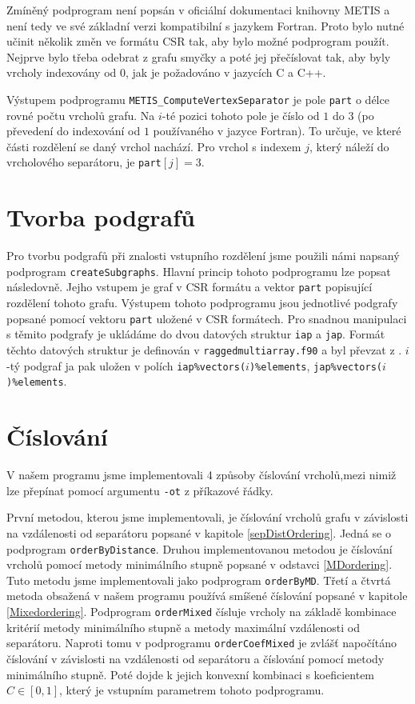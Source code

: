 \documentclass{ctuthesis}
\theoremstyle{plain}
\theoremstyle{definition}
\begin{document}
Zmíněný podprogram není popsán v oficiální dokumentaci knihovny METIS a není tedy ve své základní verzi kompatibilní s jazykem Fortran. Proto bylo nutné učinit několik změn ve formátu CSR tak, aby bylo možné podprogram použít. Nejprve bylo třeba odebrat z grafu smyčky a poté jej přečíslovat tak, aby byly vrcholy indexovány od 0, jak je požadováno v jazycích C a C++.

Výstupem podprogramu \texttt{METIS\_ComputeVertexSeparator} je pole \texttt{part} o délce rovné počtu vrcholů grafu. Na $i$-té pozici tohoto pole je číslo od $1$ do $3$ (po převedení do indexování od $1$ používaného v jazyce Fortran). To určuje, ve které části rozdělení se daný vrchol nachází. Pro vrchol s indexem $j$, který náleží do vrcholového separátoru, je \texttt{part}$[j] = 3$.

\section{Tvorba podgrafů}
Pro tvorbu podgrafů při znalosti vstupního rozdělení jsme použili námi napsaný podprogram \texttt{createSubgraphs}. Hlavní princip tohoto podprogramu lze popsat následovně. Jejho vstupem je graf v CSR formátu a vektor \texttt{part} popisující rozdělení tohoto grafu. Výstupem tohoto podprogramu jsou jednotlivé podgrafy popsané pomocí vektoru \texttt{part} uložené v CSR formátech. Pro snadnou manipulaci s těmito podgrafy je ukládáme do dvou datových struktur \texttt{iap} a \texttt{jap}. Formát těchto datových struktur je definován v \texttt{raggedmultiarray.f90} a byl převzat z \cite{ragmult}. $i$-tý podgraf ja pak uložen v polích \texttt{iap\%vectors($i$)\%elements}, \texttt{jap\%vectors($i$)\%elements}.


\section{Číslování}
V našem programu jsme implementovali 4 způsoby číslování vrcholů,mezi nimiž lze přepínat pomocí argumentu \texttt{-ot} z příkazové řádky.

První metodou, kterou jsme implementovali, je číslování vrcholů grafu v závislosti na vzdálenosti od separátoru popsané v kapitole \ref{sepDistOrdering}. Jedná se o podprogram \texttt{orderByDistance}. Druhou implementovanou metodou je číslování vrcholů pomocí metody minimálního stupně popsané v odstavci \ref{MDordering}. Tuto metodu jsme implementovali jako podprogram \texttt{orderByMD}. Třetí a čtvrtá metoda obsažená v našem programu používá smíšené číslování popsané v kapitole \ref{Mixedordering}. Podprogram \texttt{orderMixed} čísluje vrcholy na základě kombinace kritérií metody minimálního stupně a metody maximální vzdálenosti od separátoru. Naproti tomu v podprogramu \texttt{orderCoefMixed} je zvlášť napočítáno číslování v závislosti na vzdálenosti od separátoru a číslování pomocí metody minimálního stupně. Poté dojde k jejich konvexní kombinaci s koeficientem $C \in [0,1]$, který je vstupním parametrem tohoto podprogramu.
\end{document}
